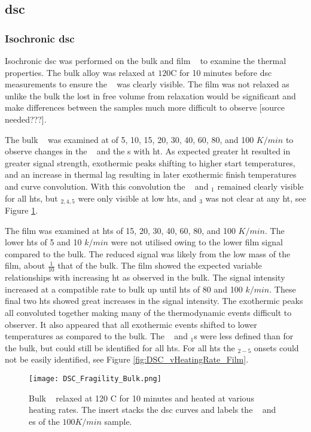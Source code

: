 \documentclass[a4paper,12pt,oneside]{article}%
\begin{document}
\subsection{\acrshort{dsc}}
\subsubsection{Isochronic \acrshort{dsc}}
Isochronic \acrshort{dsc} was performed on the bulk and film \MgZnCa~ to examine the thermal properties. The bulk alloy was relaxed at $120$\degree C for 10 minutes before \acrshort{dsc} measurements to ensure the \Tg~ was clearly visible. The film was not relaxed as unlike the bulk the lost in free volume from relaxation would be significant and make differences between the samples much more difficult to observe [source needed???]. 

The bulk \MgZnCa~ was examined at  of 5, 10, 15, 20, 30, 40, 60, 80, and 100 $K/min$ to observe changes in the \Tg~ and the \Tx s with \gls{ht}. As expected greater \gls{ht} resulted in greater signal strength, exothermic peaks shifting to higher start temperatures, and an increase in thermal lag resulting in later exothermic finish temperatures and curve convolution. With this convolution the \Tg~ and \Tx $_{1}$  remained clearly visible for all \glspl{ht}, but \Tx $_{2,4,5}$ were only visible at low \glspl{ht}, and \Tx $_{3}$ was not clear at any \gls{ht}, see Figure \ref{fig:DSC_vHeatingRate_Bulk}.

The film was examined at \glspl{ht} of 15, 20, 30, 40, 60, 80, and 100 $K/min$. The lower \glspl{ht} of 5 and 10 $k/min$ were not utilised owing to the lower film signal compared to the bulk. The reduced signal was likely from the low mass of the film, about $\frac{1}{10}$ that of the bulk. The film showed the expected variable relationships with increasing \gls{ht} as observed in the bulk. The signal intensity increased at a compatible rate to bulk up until \glspl{ht} of 80 and 100 $k/min$. These final two \glspl{ht} showed great increases in the signal intensity. The exothermic peaks all convoluted together making many of the thermodynamic events difficult to observer. It also appeared that all exothermic events shifted to lower temperatures as compared to the bulk. The \Tg~ and \Tx $_{1}$s were less defined than for the bulk, but could still be identified for all \glspl{ht}. For all \glspl{ht} the \Tx $_{2-5}$ onsets could not be easily identified, see Figure \ref{fig:DSC_vHeatingRate_Film}.

\begin{figure}[b]
	\centering
	\texttt{[image: DSC\_Fragility\_Bulk.png]}
	\caption[Table of contents Capition]{Bulk \MgZnCa~ relaxed at 120 \degree C for 10 minutes and heated at various heating rates. The insert stacks the \gls{dsc} curves and labels the \Tg~ and \Tx es of the $100 K/min$ sample.}%
	\label{fig:DSC_vHeatingRate_Bulk}
\end{figure}
\end{document}
